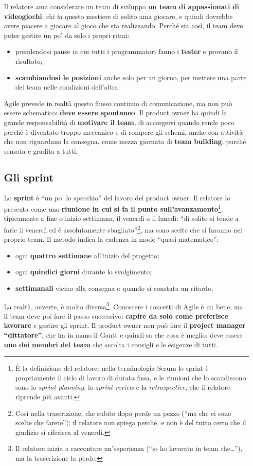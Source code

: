 Il relatore ama considerare un team di sviluppo \textbf{un team di appassionati
di videogiochi}: chi fa questo mestiere di solito ama giocare, e quindi dovrebbe
avere piacere a giocare al gioco che sta realizzando. Perché sia così, il team
deve poter gestire un po' da solo i propri ritmi:
\begin{itemize}
  \item prendendosi pause in cui tutti i programmatori fanno i
        \textbf{tester} e provano il risultato;
  \item \textbf{scambiandosi le posizioni} anche solo per un giorno, per mettere
        una parte del team nelle condizioni dell'altra.
\end{itemize}
Agile prevede in realtà questo flusso continuo di comunicazione, ma non può
essere schematico: \textbf{deve essere spontaneo}. Il product owner ha quindi la
grande responsabilità di \textbf{motivare il team}, di accorgersi quando rende
poco perché è diventato troppo meccanico e di rompere gli schemi, anche con
attività che non riguardano la consegna, come mezza giornata di \textbf{team
building}, purché sensata e gradita a tutti.

\subsection{Gli sprint}

Lo \textbf{sprint} è ``un po' lo specchio'' del lavoro del product owner. Il
relatore lo presenta come una \textbf{riunione in cui si fa il punto
sull'avanzamento}\footnote{È la definizione del relatore: nella terminologia
Scrum lo sprint è propriamente il ciclo di lavoro di durata fissa, e le
riunioni che lo scandiscono sono lo \emph{sprint planning}, la \emph{sprint
review} e la \emph{retrospective}, che il relatore riprende più avanti.},
tipicamente a fine o inizio settimana, il venerdì o il lunedì: ``di solito si
tende a farle il venerdì ed è assolutamente sbagliato''\footnote{Così nella
trascrizione, che subito dopo perde un pezzo (``ma che ci sono scelte che
farete''); il relatore non spiega perché, e non è del tutto certo che il
giudizio si riferisca al venerdì.}, ma sono scelte che si faranno nel proprio
team. Il metodo indica la cadenza in modo ``quasi matematico'':
\begin{itemize}
  \item ogni \textbf{quattro settimane} all'inizio del progetto;
  \item ogni \textbf{quindici giorni} durante lo svolgimento;
  \item \textbf{settimanali} vicino alla consegna o quando si constata un
        ritardo.
\end{itemize}
La realtà, avverte, è molto diversa\footnote{Il relatore inizia a raccontare
un'esperienza (``io ho lavorato in team che\dots''), ma la trascrizione la
perde.}. Conoscere i concetti di Agile è un bene, ma il team deve poi fare il
passo successivo: \textbf{capire da solo come preferisce lavorare} e gestire gli
sprint. Il product owner non può fare il \textbf{project manager ``dittatore''},
che ha in mano il Gantt e quindi sa che cosa è meglio: deve essere \textbf{uno
dei membri del team} che ascolta i consigli e le esigenze di tutti.

